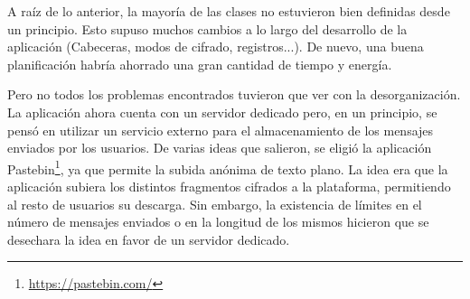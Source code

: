 A raíz de lo anterior, la mayoría de las clases no estuvieron bien definidas
desde un principio. Esto supuso muchos cambios a lo largo del desarrollo de la
aplicación (Cabeceras, modos de cifrado, registros...). De nuevo, una buena
planificación habría ahorrado una gran cantidad de tiempo y energía.

Pero no todos los problemas encontrados tuvieron que ver con la desorganización.
La aplicación ahora cuenta con un servidor dedicado pero, en un principio, se
pensó en utilizar un servicio externo para el almacenamiento de los mensajes
enviados por los usuarios. De varias ideas que salieron, se eligió la aplicación
Pastebin\footnote{\url{https://pastebin.com/}}, ya que permite la subida anónima
de texto plano. La idea era que la aplicación subiera los distintos fragmentos
cifrados a la plataforma, permitiendo al resto de usuarios su descarga. Sin
embargo, la existencia de límites en el número de mensajes enviados o en la
longitud de los mismos hicieron que se desechara la idea en favor de un
servidor dedicado.
